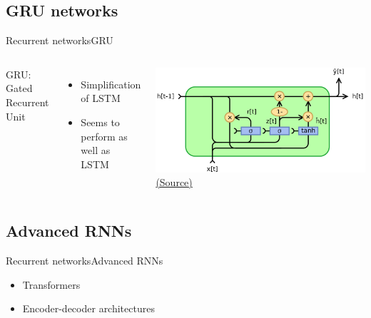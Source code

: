 \documentclass[10pt,compress]{beamer} %
\begin{document}
\subsection{GRU networks}
\begin{frame}{Recurrent networks}{GRU}
    \begin{columns}
            GRU: Gated Recurrent Unit
            \begin{itemize}
                \item Simplification of LSTM
                \item Seems to perform as well as LSTM
            \end{itemize}
            \centering \includegraphics[width=\textwidth]{figs/GRU.png}\\
	        \scriptsize\href{https://en.wikipedia.org/wiki/Gated_recurrent_unit}{(Source)}
    \end{columns}
\end{frame}

\subsection{Advanced RNNs}
\begin{frame}{Recurrent networks}{Advanced RNNs}
      \begin{itemize}
          \item Transformers
          \item Encoder-decoder architectures
      \end{itemize}
\end{frame}
\end{document}
